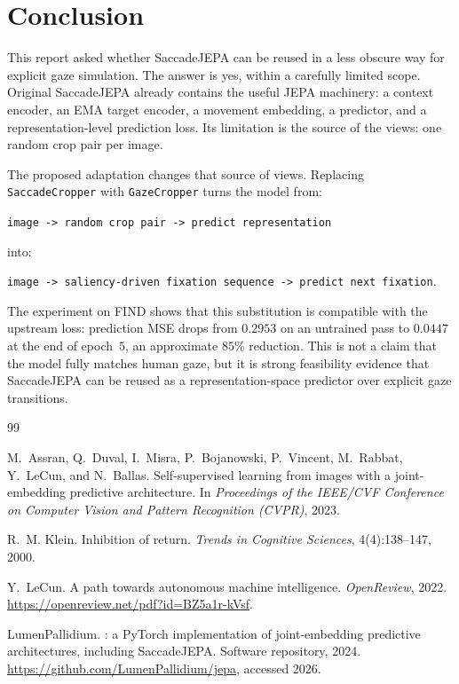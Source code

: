 \documentclass[12pt,a4paper]{article}
\begin{document}
\section{Conclusion}
\label{sec:conclusion}

This report asked whether SaccadeJEPA can be reused in a less obscure way for
explicit gaze simulation. The answer is yes, within a carefully limited scope.
Original SaccadeJEPA already contains the useful JEPA machinery: a context
encoder, an EMA target encoder, a movement embedding, a predictor, and a
representation-level prediction loss. Its limitation is the source of the
views: one random crop pair per image.

The proposed adaptation changes that source of views. Replacing
\texttt{SaccadeCropper} with \texttt{GazeCropper} turns the model from:

\begin{center}
\texttt{image -> random crop pair -> predict representation}
\end{center}

into:

\begin{center}
\texttt{image -> saliency-driven fixation sequence -> predict next fixation}.
\end{center}

The experiment on FIND shows that this substitution is compatible with the
upstream loss: prediction MSE drops from $0.2953$ on an untrained pass to
$0.0447$ at the end of epoch~$5$, an approximate $85\%$ reduction. This is
not a claim that the model fully matches human gaze, but it is strong
feasibility evidence that SaccadeJEPA can be reused as a representation-space
predictor over explicit gaze transitions.


\begin{thebibliography}{99}

M.~Assran, Q.~Duval, I.~Misra, P.~Bojanowski, P.~Vincent, M.~Rabbat,
  Y.~LeCun, and N.~Ballas.
\newblock Self-supervised learning from images with a joint-embedding
  predictive architecture.
\newblock In \emph{Proceedings of the {IEEE/CVF} Conference on Computer Vision
  and Pattern Recognition (CVPR)}, 2023.

R.~M. Klein.
\newblock Inhibition of return.
\newblock \emph{Trends in Cognitive Sciences}, 4(4):138--147, 2000.

Y.~LeCun.
\newblock A path towards autonomous machine intelligence.
\newblock \emph{OpenReview}, 2022.
\newblock \url{https://openreview.net/pdf?id=BZ5a1r-kVsf}.

{LumenPallidium}.
: a {PyTorch} implementation of joint-embedding predictive
  architectures, including {SaccadeJEPA}.
\newblock Software repository, 2024.
\newblock \url{https://github.com/LumenPallidium/jepa}, accessed 2026.

\end{thebibliography}
\end{document}
